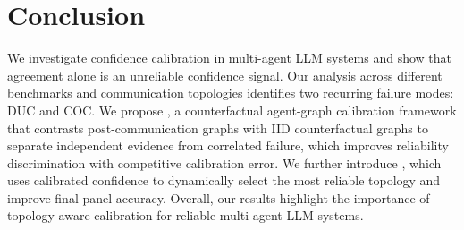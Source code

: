 \section{Conclusion}
\label{sec:conclusion}

We investigate confidence calibration in multi-agent LLM systems and show that agreement alone is an unreliable confidence signal.
Our analysis across different benchmarks and communication topologies identifies two recurring failure modes: DUC and COC.
We propose \methodname{}, a counterfactual agent-graph calibration framework that contrasts post-communication graphs with IID counterfactual graphs to separate independent evidence from correlated failure, which improves reliability discrimination with competitive calibration error. 
We further introduce \select{}, which uses calibrated confidence to dynamically select the most reliable topology and improve final panel accuracy. 
Overall, our results highlight the importance of topology-aware calibration for reliable multi-agent LLM systems.